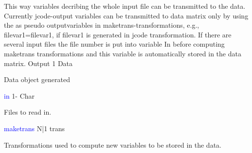 This way variables decribing the whole input file can be transmitted to the data.
Currently jcode-output variables can be transmitted to data matrix only by using the as pseudo
outputvariables in maketrans-transformations, e.g., filevar1=filevar1, if
filevar1 is generated in jcode transformation.
If there are several input files the file number is put into variable In before computing maketrans transformations
and this variable is automatically stored in the data matrix.
\vspace{0.3cm}
\hline
\vspace{0.3cm}
\noindent Output \tabto{3cm} 1 \tabto{5cm}  Data \tabto{7cm}
\begin{changemargin}{3cm}{0cm}
\noindent  Data object generated
\end{changemargin}
\vspace{0.3cm}
\hline
\vspace{0.3cm}
\noindent \textcolor{blue}{in} \tabto{3cm} 1- \tabto{5cm}  Char \tabto{7cm}
\begin{changemargin}{3cm}{0cm}
\noindent Files to read in.
\end{changemargin}
\vspace{0.3cm}
\hline
\vspace{0.3cm}
\noindent \textcolor{blue}{maketrans} \tabto{3cm} N|1 \tabto{5cm}  trans \tabto{7cm}
\begin{changemargin}{3cm}{0cm}
\noindent  Transformations used to compute new variables to be stored
in the data.
\end {changemargin}
\hline
\vspace{0.2cm}
